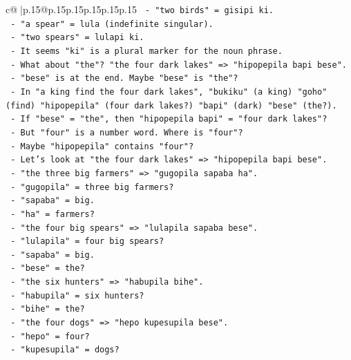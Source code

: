 \documentclass{article}
\begin{document}
{\begin{supertabular}{c@{$\;$}|p{.15\linewidth}@{}p{.15\linewidth}p{.15\linewidth}p{.15\linewidth}p{.15\linewidth}p{.15\linewidth}}
{{{\texttt{         {-} "two birds" = gisipi ki.} \\
\texttt{         {-} "a spear" = lula (indefinite singular).} \\
\texttt{         {-} "two spears" = lulapi ki.} \\
\texttt{         {-} It seems "ki" is a plural marker for the noun phrase.} \\
\texttt{         {-} What about "the"? "the four dark lakes" => "hipopepila bapi bese".} \\
\texttt{           {-} "bese" is at the end. Maybe "bese" is "the"?} \\
\texttt{           {-} In "a king find the four dark lakes", "bukiku" (a king) "goho" (find) "hipopepila" (four dark lakes?) "bapi" (dark) "bese" (the?).} \\
\texttt{           {-} If "bese" = "the", then "hipopepila bapi" = "four dark lakes"?} \\
\texttt{           {-} But "four" is a number word. Where is "four"?} \\
\texttt{           {-} Maybe "hipopepila" contains "four"?} \\
\texttt{           {-} Let's look at "the four dark lakes" => "hipopepila bapi bese".} \\
\texttt{           {-} "the three big farmers" => "gugopila sapaba ha".} \\
\texttt{             {-} "gugopila" = three big farmers?} \\
\texttt{             {-} "sapaba" = big.} \\
\texttt{             {-} "ha" = farmers?} \\
\texttt{           {-} "the four big spears" => "lulapila sapaba bese".} \\
\texttt{             {-} "lulapila" = four big spears?} \\
\texttt{             {-} "sapaba" = big.} \\
\texttt{             {-} "bese" = the?} \\
\texttt{           {-} "the six hunters" => "habupila bihe".} \\
\texttt{             {-} "habupila" = six hunters?} \\
\texttt{             {-} "bihe" = the?} \\
\texttt{           {-} "the four dogs" => "hepo kupesupila bese".} \\
\texttt{             {-} "hepo" = four?} \\
\texttt{             {-} "kupesupila" = dogs?} \\
}}}
\end{supertabular}}
\end{document}
